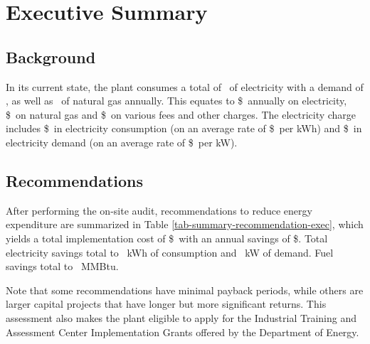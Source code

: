 \section*{Executive Summary}


\subsection*{Background}

In its current state, the plant consumes a total of \kWhUsage \ of electricity with a demand of \kWUsage, as well as \FuelUsage \ of natural gas annually. This equates to \$\TotalElecCosts \ annually on electricity, \$\FuelCosts \ on natural gas and \$\TotalOtherFee \ on various fees and other charges. The electricity charge includes \$\kWhCosts \ in electricity consumption (on an average rate of \$\RatekWh \ per kWh) and \$\kWCosts \ in electricity demand (on an average rate of \$\RatekW \ per kW). 


\subsection*{Recommendations}

After performing the on-site audit, recommendations to reduce energy expenditure are summarized in Table \ref{tab-summary-recommendation-exec}, which yields a total implementation cost of \$\TotalRecImplementation\  with an annual savings of \$\TotalRecSavings. Total electricity savings total to \TotalkWhSavings\ kWh of consumption and \TotalkWSavings\ kW of demand.  Fuel savings total to \TotalGasSavings\ MMBtu. 

Note that some recommendations have minimal payback periods, while others are larger capital projects that have longer but more significant returns. This assessment also makes the plant eligible to apply for the Industrial Training and Assessment Center Implementation Grants offered by the Department of Energy.


